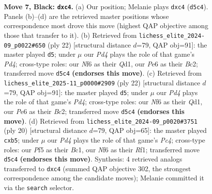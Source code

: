 \documentclass[11pt]{article}
\begin{document}
\begin{figure}[p]
\caption{\textbf{Move 7, Black: \texttt{dxc4}.} (a) Our position; Melanie plays \texttt{dxc4} (\texttt{d5c4}). Panels (b)--(d) are the retrieved master positions whose correspondence most drove this move (highest QAP objective among those that transfer to it). (b) Retrieved from \texttt{lichess\_elite\_2024-09\_p0022\#650} (ply 22) [structural distance $d$=79, QAP obj=91]: the master played \texttt{d5}; under $\mu$ our \emph{Pd4} plays the role of that game's \emph{Pd4}; cross-type roles: our \emph{N}f6 as their \emph{Q}d1, our \emph{P}e6 as their \emph{B}c2; transferred move \texttt{d5c4} \textbf{(endorses this move)}. (c) Retrieved from \texttt{lichess\_elite\_2025-11\_p0000\#2909} (ply 22) [structural distance $d$=79, QAP obj=91]: the master played \texttt{d5}; under $\mu$ our \emph{Pd4} plays the role of that game's \emph{Pd4}; cross-type roles: our \emph{N}f6 as their \emph{Q}d1, our \emph{P}e6 as their \emph{B}c2; transferred move \texttt{d5c4} \textbf{(endorses this move)}. (d) Retrieved from \texttt{lichess\_elite\_2024-09\_p0020\#3751} (ply 20) [structural distance $d$=79, QAP obj=65]: the master played \texttt{cxb5}; under $\mu$ our \emph{Pd4} plays the role of that game's \emph{Pc4}; cross-type roles: our \emph{P}f5 as their \emph{B}c1, our \emph{N}f6 as their \emph{R}f1; transferred move \texttt{d5c4} \textbf{(endorses this move)}. Synthesis: 4 retrieved analogs transferred to \texttt{dxc4} (summed QAP objective 302, the strongest correspondence among the candidate moves); Melanie committed it via the \texttt{search} selector.}
\label{fig:thought-m13}
\end{figure}

\clearpage
\end{document}
